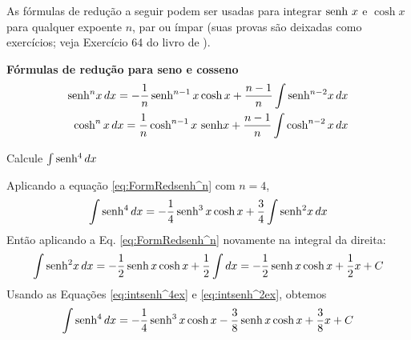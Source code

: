 \cleardoublepage\documentclass[../main.tex]{subfiles}
\begin{document}
As fórmulas de redução a seguir podem ser usadas para integrar $\operatorname{senh}\, x$ e $\cosh x$ para qualquer expoente $n$, par ou ímpar (suas provas são deixadas como exercícios; veja Exercício 64 do livro de ).
\begin{framed}
\textbf{Fórmulas de redução para seno e cosseno}
\begin{align}
    \senh\!\!^n x\, dx=-\frac{1}{n}\senh\!\!^{n-1}\, x \cosh x+\frac{n-1}{n}\int \senh\!\!^{n-2} x\, dx\label{eq:FormRedsenh^n}\\
    \cosh^n x\, dx=\frac{1}{n}\cosh^{n-1} x\, \senh\!\! x+\frac{n-1}{n}\int \cosh^{n-2} x\, dx\label{eq:FormRedcosh^n}
\end{align}
\end{framed}

\begin{ex}
  Calcule $\int \operatorname{senh}\,\!\!^4\, dx$
  \begin{resol}
    Aplicando a equação \eqref{eq:FormRedsenh^n} com $n=4$,
    \begin{equation}
        \int \operatorname{senh}\,\!\!^4\, dx=-\frac{1}{4}\operatorname{senh}\,\!\!^3\, x\cosh x+\frac{3}{4}\int \operatorname{senh}\,\!\!^2 x\, dx\label{eq:intsenh^4ex}
    \end{equation}
       Então aplicando a Eq. \eqref{eq:FormRedsenh^n} novamente na integral da direita:
    \begin{equation}
        \int \operatorname{senh}\,\!\!^2 x\, dx=-\frac{1}{2}\operatorname{senh}\,\!\!\, x\cosh x+\frac{1}{2}\int  dx=-\frac{1}{2}\operatorname{senh}\,\!\!\, x\cosh x+\frac{1}{2}x+C\label{eq:intsenh^2ex}
    \end{equation}
    Usando as Equações \eqref{eq:intsenh^4ex} e \eqref{eq:intsenh^2ex}, obtemos
    \begin{equation*}
         \int \operatorname{senh}\,\!\!^4\, dx=-\frac{1}{4}\operatorname{senh}\,\!\!^3\, x\cosh x-\frac{3}{8}\operatorname{senh}\,\!\!\, x\cosh x+\frac{3}{8}x+C
    \end{equation*}
  \end{resol}
\end{ex}
\end{document}
